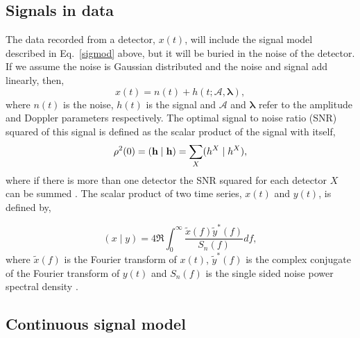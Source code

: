 \subsection{\label{intro:search:signals} Signals in data}

The data recorded from a detector, $x(t)$, will include the signal model described in Eq.~\ref{sigmod} above, but it will be buried in the noise of the detector. 
If we assume the noise is Gaussian distributed and the noise and signal add linearly, then,  
\begin{equation}
\label{signalinnoise}
x(t) = n(t) + h(t; \mathcal{A},{\boldsymbol \lambda}) ,
\end{equation}
where $n(t)$ is the noise, $h(t)$ is the signal and $\mathcal{A}$ and ${\boldsymbol \lambda}$ refer to the amplitude and Doppler parameters respectively. 
The optimal signal to noise ratio (SNR) squared of this signal is defined as the scalar product of the signal with itself,
\begin{equation}
\rho^2(0) = ({\bf h} \mid {\bf h}) = \sum_X(h^X \mid h^X),
\end{equation}
where if there is more than one detector the SNR squared for each detector $X$ can be summed \cite{Prix2007}. 
The scalar product of two time series, $x(t)$ and $y(t)$, is defined by,

\begin{equation}
\label{intro:search:signals:scalarproduct}
(x \mid y) = 4 \Re \int_{0}^{\infty} \frac{\tilde{x}(f)\tilde{y}^{*}(f)}{S_n(f)}df,
\end{equation}
where $\tilde{x}(f)$ is the Fourier transform of $x(t)$, $\tilde{y}^{*}(f)$ is the complex conjugate of the Fourier transform of $y(t)$ and $S_n(f)$ is the single sided noise power spectral density \cite{Prix2007}.


\subsection{\label{intro:search:model}Continuous signal model}

